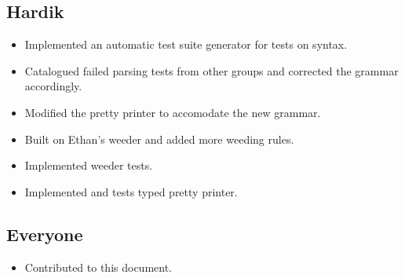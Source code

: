 \documentclass{article}
\begin{document}
\subsection*{Hardik}

\begin{itemize}
    \item Implemented an automatic test suite generator for tests on syntax.
    \item Catalogued failed parsing tests from other groups and corrected the grammar accordingly.
    \item Modified the pretty printer to accomodate the new grammar.
    \item Built on Ethan's weeder and added more weeding rules.
    \item Implemented weeder tests.
    \item Implemented and tests typed pretty printer.
\end{itemize}

\subsection*{Everyone}

\begin{itemize}
    \item Contributed to this document.
\end{itemize}
\end{document}
